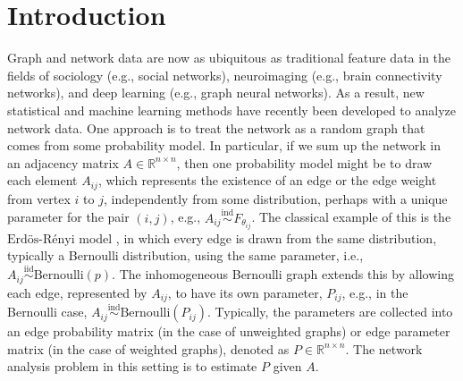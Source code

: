 \documentclass[12pt]{article}
\begin{document}
\newcommand{\diag}{\mathrm{diag}}
\newcommand{\tr}{\mathrm{Tr}}
\newcommand{\blockdiag}{\mathrm{blockdiag}}
\newcommand{\indep}{\stackrel{\mathrm{ind}}{\sim}}
\newcommand{\iid}{\stackrel{\mathrm{iid}}{\sim}}
\newcommand{\Bernoulli}{\mathrm{Bernoulli}}
\newcommand{\Betadist}{\mathrm{Beta}}
\newcommand{\BG}{\mathrm{BernoulliGraph}}
\newcommand{\Uniform}{\mathrm{Uniform}}
\newcommand{\PABM}{\mathrm{PABM}}
\newcommand{\RDPG}{\mathrm{RDPG}}
\newcommand{\GRDPG}{\mathrm{GRDPG}}
\newcommand{\Multinomial}{\mathrm{Multinomial}}
\newcommand{\Categorical}{\mathrm{Categorical}}
\newcommand{\dd}{\mathrm{d}}
\newcommand{\as}{\stackrel{\mathrm{a.s.}}{\to}}
\newcommand{\ER}{\text{Erd\"{o}s-R\'{e}nyi}}
\newcommand{\SBM}{\mathrm{SBM}}
\newcommand{\DCBM}{\mathrm{DCBM}}
\newcommand{\rank}{\mathrm{rank}}
\newcommand{\MBM}{\mathrm{MBM}}
\newcommand{\LSM}{\mathrm{LSM}}
\newcommand{\MLSM}{\mathrm{MLSM}}
\newcommand{\Poisson}{\mathrm{Poisson}}
\newtheorem{theorem}{Theorem}
\newtheorem{lemma}{Lemma}
\newtheorem{corollary}{Corollary}
\newtheorem{proposition}{Proposition}
\theoremstyle{remark}
\newtheorem{remark}{Remark}
\theoremstyle{definition}
\newtheorem{definition}{Definition}
\newtheorem{example}{Example}

\hypertarget{introduction}{%
\section{Introduction}\label{introduction}}

Graph and network data are now as ubiquitous as traditional feature data
in the fields of sociology (e.g., social networks), neuroimaging (e.g.,
brain connectivity networks), and deep learning (e.g., graph neural
networks). As a result, new statistical and machine learning methods
have recently been developed to analyze network data. One approach is to
treat the network as a random graph that comes from some probability
model. In particular, if we sum up the network in an adjacency matrix
\(A \in \mathbb{R}^{n \times n}\), then one probability model might be
to draw each element \(A_{ij}\), which represents the existence of an
edge or the edge weight from vertex \(i\) to \(j\), independently from
some distribution, perhaps with a unique parameter for the pair
\((i,j)\), e.g., \(A_{ij} \indep F_{\theta_{ij}}\). The classical
example of this is the \(\ER\) model \citep{Gilbert:1959}, in which
every edge is drawn from the same distribution, typically a Bernoulli
distribution, using the same parameter, i.e.,
\(A_{ij} \iid \Bernoulli (p)\). The inhomogeneous Bernoulli graph
extends this by allowing each edge, represented by \(A_{ij}\), to have
its own parameter, \(P_{ij}\), e.g., in the Bernoulli case,
\(A_{ij} \indep \Bernoulli(P_{ij})\). Typically, the parameters are
collected into an edge probability matrix (in the case of unweighted
graphs) or edge parameter matrix (in the case of weighted graphs),
denoted as \(P \in \mathbb{R}^{n \times n}\). The network analysis
problem in this setting is to estimate \(P\) given \(A\).
\end{document}
